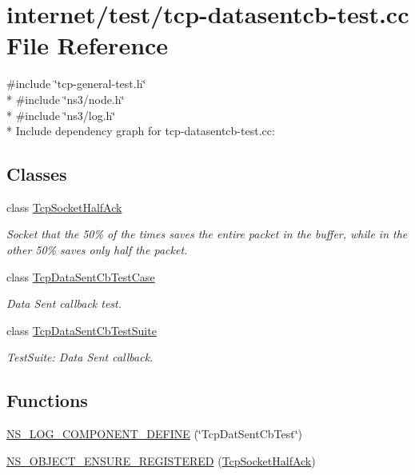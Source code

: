 \hypertarget{tcp-datasentcb-test_8cc}{}\section{internet/test/tcp-\/datasentcb-\/test.cc File Reference}
\label{tcp-datasentcb-test_8cc}
{\ttfamily \#include \char`\"{}tcp-\/general-\/test.\+h\char`\"{}}\\*
{\ttfamily \#include \char`\"{}ns3/node.\+h\char`\"{}}\\*
{\ttfamily \#include \char`\"{}ns3/log.\+h\char`\"{}}\\*
Include dependency graph for tcp-\/datasentcb-\/test.cc\+:
\subsection*{Classes}
\begin{DoxyCompactItemize}
\item 
class \hyperlink{classTcpSocketHalfAck}{Tcp\+Socket\+Half\+Ack}
\begin{DoxyCompactList}\small\item\em Socket that the 50\% of the times saves the entire packet in the buffer, while in the other 50\% saves only half the packet. \end{DoxyCompactList}\item 
class \hyperlink{classTcpDataSentCbTestCase}{Tcp\+Data\+Sent\+Cb\+Test\+Case}
\begin{DoxyCompactList}\small\item\em Data Sent callback test. \end{DoxyCompactList}\item 
class \hyperlink{classTcpDataSentCbTestSuite}{Tcp\+Data\+Sent\+Cb\+Test\+Suite}
\begin{DoxyCompactList}\small\item\em Test\+Suite\+: Data Sent callback. \end{DoxyCompactList}\end{DoxyCompactItemize}
\subsection*{Functions}
\begin{DoxyCompactItemize}
\item 
\hyperlink{tcp-datasentcb-test_8cc_a6a6bccd898686c118ae6faa530a9ab09}{N\+S\+\_\+\+L\+O\+G\+\_\+\+C\+O\+M\+P\+O\+N\+E\+N\+T\+\_\+\+D\+E\+F\+I\+NE} (\char`\"{}Tcp\+Dat\+Sent\+Cb\+Test\char`\"{})
\item 
\hyperlink{tcp-datasentcb-test_8cc_a12085ae3e26d38c3f084d8de779a86ea}{N\+S\+\_\+\+O\+B\+J\+E\+C\+T\+\_\+\+E\+N\+S\+U\+R\+E\+\_\+\+R\+E\+G\+I\+S\+T\+E\+R\+ED} (\hyperlink{classTcpSocketHalfAck}{Tcp\+Socket\+Half\+Ack})
\end{DoxyCompactItemize}
